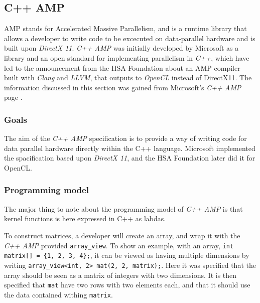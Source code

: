 \subsection{C++ AMP}
AMP stands for Accelerated Massive Parallelism, and is a runtime library that allows a developer to write code to be excecuted on data-parallel hardware and is built upon \textit{DirectX 11}. \textit{C++ AMP} was initially developed by Microsoft as a library and an open standard for implementing parallelism in \textit{C++}, which have led to the announcement from the HSA Foundation about an AMP compiler built with \textit{Clang} and \textit{LLVM}, that outputs to \textit{OpenCL} instead of DirectX11. The information discussed in this section was gained from Microsoft's \textit{C++ AMP} page \cite{microsoftCppAMP}.

\subsubsection{Goals}
The aim of the \textit{C++ AMP} specification is to provide a way of writing code for data parallel hardware directly within the C++ language. Microsoft implemented the spacification based upon \textit{DirectX 11}, and the HSA Foundation later did it for OpenCL.

\subsubsection{Programming model}
The major thing to note about the programming model of \textit{C++ AMP} is that kernel functions is here expressed in C++ as labdas. 

To construct matrices, a developer will create an array, and wrap it with the \textit{C++ AMP} provided \texttt{array\_view}. To show an example, with an array, \texttt{int matrix[] = \{1, 2, 3, 4\};}, it can be viewed as having multiple dimensions by writing \texttt{array\_view<int, 2> mat(2, 2, matrix);}. Here it was specified that the array should be seen as a matrix of integers with two dimensions. It is then specified that \texttt{mat} have two rows with two elements each, and that it should use the data contained withing \texttt{matrix}.

